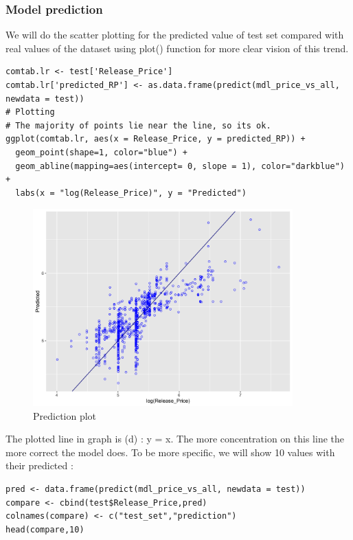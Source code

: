 \documentclass[a4paper]{article}
\theoremstyle{definition}
\begin{document}
\subsubsection{Model prediction}
We will do the scatter plotting for the predicted value of test set compared with real values of the dataset using plot() function for more clear vision of this trend.\\
\begin{mdframed}[leftline=false,rightline=false,backgroundcolor=lightblue!10,nobreak=false,numbers=false]
    \begin{verbatim}
comtab.lr <- test['Release_Price']
comtab.lr['predicted_RP'] <- as.data.frame(predict(mdl_price_vs_all, newdata = test))
# Plotting
# The majority of points lie near the line, so its ok. 
ggplot(comtab.lr, aes(x = Release_Price, y = predicted_RP)) +
  geom_point(shape=1, color="blue") +
  geom_abline(mapping=aes(intercept= 0, slope = 1), color="darkblue") +
  labs(x = "log(Release_Price)", y = "Predicted")
\end{verbatim}
\end{mdframed}
\begin{figure}[h!]
\begin{center}
\includegraphics[width=10cm]{images/pre_log.png}
\end{center}
\caption{Prediction plot}
\end{figure}
The plotted line in graph is (d) : y = x. The more concentration on this line the more correct the model does. To be more specific, we will show 10 values with their predicted : \\
\begin{mdframed}[leftline=false,rightline=false,backgroundcolor=lightblue!10,nobreak=false,numbers=false]
    \begin{verbatim}
pred <- data.frame(predict(mdl_price_vs_all, newdata = test))
compare <- cbind(test$Release_Price,pred)
colnames(compare) <- c("test_set","prediction")
head(compare,10)
\end{verbatim}
\end{mdframed}
\end{document}
